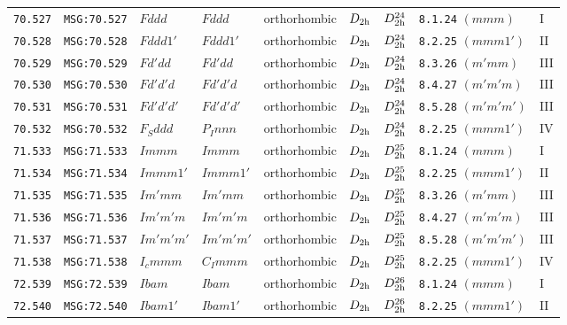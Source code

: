 \documentclass[fleqn,10pt]{jsarticle}
\begin{document}
\begin{center}
\begin{longtable}{lllllllll}
\texttt{70.527} & \texttt{MSG:70.527} & $Fddd$ & $Fddd$ & orthorhombic & $D_{\rm 2h}$ & $D_{\rm 2h}^{24}$ & \texttt{8.1.24} $(mmm)$ & I \\
\texttt{70.528} & \texttt{MSG:70.528} & $Fddd1'$ & $Fddd1'$ & orthorhombic & $D_{\rm 2h}$ & $D_{\rm 2h}^{24}$ & \texttt{8.2.25} $(mmm1')$ & II \\
\texttt{70.529} & \texttt{MSG:70.529} & $Fd'dd$ & $Fd'dd$ & orthorhombic & $D_{\rm 2h}$ & $D_{\rm 2h}^{24}$ & \texttt{8.3.26} $(m'mm)$ & III \\
\texttt{70.530} & \texttt{MSG:70.530} & $Fd'd'd$ & $Fd'd'd$ & orthorhombic & $D_{\rm 2h}$ & $D_{\rm 2h}^{24}$ & \texttt{8.4.27} $(m'm'm)$ & III \\
\texttt{70.531} & \texttt{MSG:70.531} & $Fd'd'd'$ & $Fd'd'd'$ & orthorhombic & $D_{\rm 2h}$ & $D_{\rm 2h}^{24}$ & \texttt{8.5.28} $(m'm'm')$ & III \\
\texttt{70.532} & \texttt{MSG:70.532} & $F_{S}ddd$ & $P_{I}nnn$ & orthorhombic & $D_{\rm 2h}$ & $D_{\rm 2h}^{24}$ & \texttt{8.2.25} $(mmm1')$ & IV \\ \hline
\texttt{71.533} & \texttt{MSG:71.533} & $Immm$ & $Immm$ & orthorhombic & $D_{\rm 2h}$ & $D_{\rm 2h}^{25}$ & \texttt{8.1.24} $(mmm)$ & I \\
\texttt{71.534} & \texttt{MSG:71.534} & $Immm1'$ & $Immm1'$ & orthorhombic & $D_{\rm 2h}$ & $D_{\rm 2h}^{25}$ & \texttt{8.2.25} $(mmm1')$ & II \\
\texttt{71.535} & \texttt{MSG:71.535} & $Im'mm$ & $Im'mm$ & orthorhombic & $D_{\rm 2h}$ & $D_{\rm 2h}^{25}$ & \texttt{8.3.26} $(m'mm)$ & III \\
\texttt{71.536} & \texttt{MSG:71.536} & $Im'm'm$ & $Im'm'm$ & orthorhombic & $D_{\rm 2h}$ & $D_{\rm 2h}^{25}$ & \texttt{8.4.27} $(m'm'm)$ & III \\
\texttt{71.537} & \texttt{MSG:71.537} & $Im'm'm'$ & $Im'm'm'$ & orthorhombic & $D_{\rm 2h}$ & $D_{\rm 2h}^{25}$ & \texttt{8.5.28} $(m'm'm')$ & III \\
\texttt{71.538} & \texttt{MSG:71.538} & $I_{c}mmm$ & $C_{I}mmm$ & orthorhombic & $D_{\rm 2h}$ & $D_{\rm 2h}^{25}$ & \texttt{8.2.25} $(mmm1')$ & IV \\ \hline
\texttt{72.539} & \texttt{MSG:72.539} & $Ibam$ & $Ibam$ & orthorhombic & $D_{\rm 2h}$ & $D_{\rm 2h}^{26}$ & \texttt{8.1.24} $(mmm)$ & I \\
\texttt{72.540} & \texttt{MSG:72.540} & $Ibam1'$ & $Ibam1'$ & orthorhombic & $D_{\rm 2h}$ & $D_{\rm 2h}^{26}$ & \texttt{8.2.25} $(mmm1')$ & II \\

\end{longtable}
\end{center}
\end{document}
